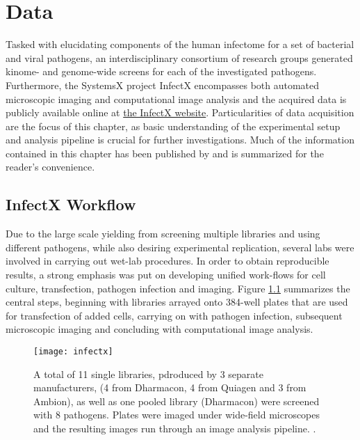 \chapter{Data}

Tasked with elucidating components of the human infectome for a set of bacterial and viral pathogens, an interdisciplinary consortium of research groups generated kinome- and genome-wide  screens for each of the investigated pathogens. Furthermore, the SystemsX  project InfectX encompasses both automated microscopic imaging and computational image analysis and the acquired data is publicly available online at \href{http://www.infectx.ch/databrowser}{the InfectX website}. Particularities of data acquisition are the focus of this chapter, as basic understanding of the experimental setup and analysis pipeline is crucial for further investigations. Much of the information contained in this chapter has been published by \citet{Ramo2014} and is summarized for the reader's convenience.

\section{InfectX Workflow}
Due to the large scale yielding from screening multiple libraries and using different pathogens, while also desiring experimental replication, several labs were involved in carrying out wet-lab procedures. In order to obtain reproducible results, a strong emphasis was put on developing unified work-flows for cell culture,  transfection, pathogen infection and imaging. Figure \ref{fig:infectx} summarizes the central steps, beginning with  libraries arrayed onto 384-well plates that are used for transfection of added cells, carrying on with pathogen infection, subsequent microscopic imaging and concluding with computational image analysis.

\begin{figure}
  \centering
  \texttt{[image: infectx]}
  \caption[InfectX  data acquisition and analysis workflow.]{A total of 11 single  libraries, pdroduced by 3 separate manufacturers, (4 from Dharmacon, 4 from Quiagen and 3 from Ambion), as well as one pooled library (Dharmacon) were screened with 8 pathogens. Plates were imaged under wide-field microscopes and the resulting images run through an image analysis pipeline. \citep{Ramo2014}.}
  \label{fig:infectx}
\end{figure}


